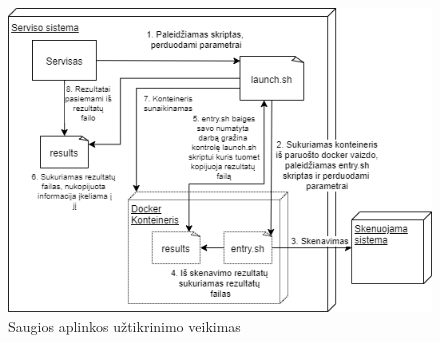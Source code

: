 \documentclass[a4paper,12pt,fleqn]{article}
\begin{document}
\begin{figure}[H]
	\centering
	\includegraphics[width=1\textwidth]{figs/docker.png}
	\caption{Saugios aplinkos užtikrinimo veikimas}
	\label{fig:docker}
\end{figure}
\end{document}
